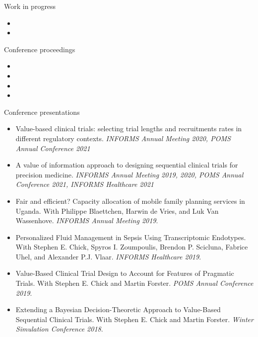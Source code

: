 \documentclass{resume}
\begin{document}
\begin{rSection}{Work in progress}
\begin{itemize}
  \item {}
  \item {}
\end{itemize}
\end{rSection}


\begin{rSection}{Conference proceedings}
\begin{itemize}
\item {}
\item {}
\item {}
\item {}
\end{itemize}

\end{rSection}

\begin{rSection}{Conference presentations}

\begin{itemize}
\item Value-based clinical trials: selecting trial lengths and recruitments rates in different regulatory contexts. \textit{INFORMS Annual Meeting 2020, POMS Annual Conference 2021}
\item A value of information approach to designing sequential clinical trials for precision medicine. \textit{INFORMS Annual Meeting 2019, 2020, POMS Annual Conference 2021, INFORMS Healthcare 2021}
\item Fair and efficient? Capacity allocation of mobile family planning services in Uganda. With Philippe Blaettchen, Harwin de Vries, and Luk Van Wassenhove. \textit{INFORMS Annual Meeting 2019}.
\item Personalized Fluid Management in Sepsis Using Transcriptomic Endotypes. With Stephen E. Chick, Spyros I. Zoumpoulis, Brendon P. Scicluna, Fabrice Uhel, and Alexander P.J. Vlaar. \textit{INFORMS Healthcare 2019}.
\item Value-Based Clinical Trial Design to Account for Features of Pragmatic Trials. With Stephen E. Chick and Martin Forster. \textit{POMS Annual Conference 2019}.
\item Extending a Bayesian Decision-Theoretic Approach to Value-Based Sequential Clinical Trials. With Stephen E. Chick and Martin Forster. \textit{Winter Simulation Conference 2018}.
\end{itemize}

\end{rSection}
\end{document}
